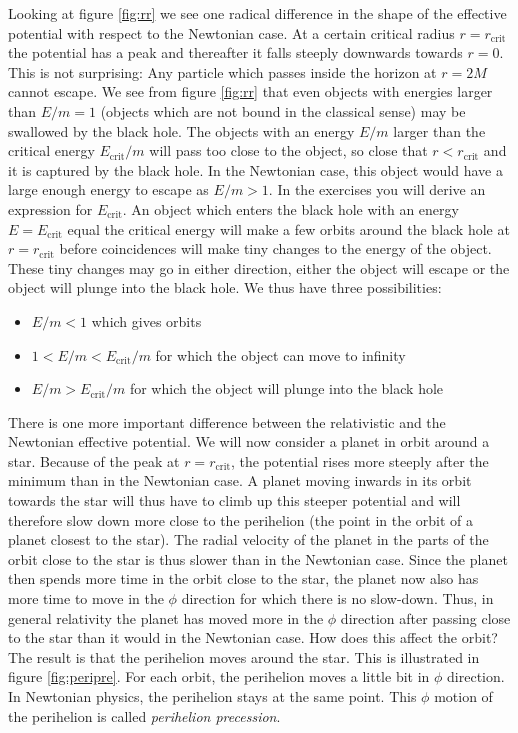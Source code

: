 {\begin{multicols}{2}
Looking at figure \ref{fig:rr} we see one radical difference in the shape of the effective potential with respect to the Newtonian case. At a certain critical radius $r=r_\mathrm{crit}$ the potential has a peak and thereafter it falls steeply downwards towards $r=0$. This is not surprising: Any particle which passes inside the horizon at $r=2M$ cannot escape. We see from figure \ref{fig:rr} that even objects with energies larger than $E/m=1$ (objects which are not bound in the classical sense) may be swallowed by the black hole. The objects with an energy $E/m$ larger than the critical energy $E_\mathrm{crit}/m$ will pass too close to the object, so close that $r<r_\mathrm{crit}$ and it is captured by the black hole. In the Newtonian case, this object would have a large enough energy to escape as $E/m>1$. In the exercises you will derive an expression for $E_\mathrm{crit}$. An object which enters the black hole with an energy $E=E_\mathrm{crit}$ equal the critical energy will make a few orbits around the black hole at $r=r_\mathrm{crit}$ before coincidences will make tiny changes to the energy of the object. These tiny changes may go in either direction, either the object will escape or the object will plunge into the black hole. We thus have three possibilities:
\begin{itemize}
\item $E/m<1$ which gives orbits
\item $1<E/m<E_\mathrm{crit}/m$ for which the object can move to infinity
\item $E/m>E_\mathrm{crit}/m$ for which the object will plunge into the black hole
\end{itemize}

There is one more important difference between the relativistic and the Newtonian effective potential. We will now consider a planet in orbit around a star. Because of the peak at $r=r_\mathrm{crit}$, the potential rises more steeply after the minimum than in the Newtonian case. A planet moving inwards in its orbit towards the star will thus have to climb up this steeper potential and will therefore slow down more close to the perihelion (the point in the orbit of a planet closest to the star). The radial velocity of the planet in the parts of the orbit close to the star is thus slower than in the Newtonian case. Since the planet then spends more time in the orbit close to the star, the planet now also has more time to move in the $\phi$ direction for which there is no slow-down. Thus, in general relativity the planet has moved more in the $\phi$ direction after passing close to the star than it would in the Newtonian case. How does this affect the orbit? The result is that the perihelion moves around the star. This is illustrated in figure \ref{fig:peripre}. For each orbit, the perihelion moves a little bit in $\phi$ direction. In Newtonian physics, the perihelion stays at the same point. This $\phi$ motion of the perihelion is called {\it perihelion precession}.


\end{multicols}}
